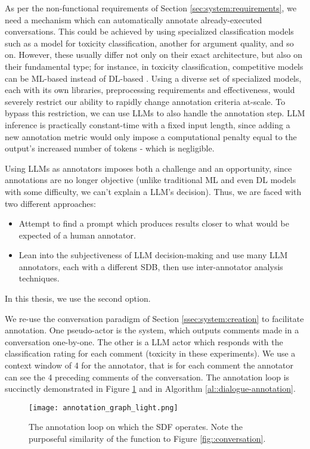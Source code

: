 As per the non-functional requirements of Section \ref{sec:system:requirements}, we need a mechanism which can automatically annotate already-executed conversations. This could be achieved by using specialized classification models such as a model for toxicity classification, another for argument quality, and so on. However, these usually differ not only on their exact architecture, but also on their fundamental type; for instance, in toxicity classification, competitive models can be ML-based instead of DL-based \cite{anjum2024hate}. Using a diverse set of specialized models, each with its own libraries, preprocessing requirements and effectiveness, would severely restrict our ability to rapidly change annotation criteria at-scale. To bypass this restriction, we can use LLMs to also handle the annotation step. LLM inference is practically constant-time with a fixed input length, since adding a new annotation metric would only impose a computational penalty equal to the output's increased number of tokens - which is negligible. 

Using LLMs as annotators imposes both a challenge and an opportunity, since annotations are no longer objective (unlike traditional ML and even DL models with some difficulty, we can't explain a LLM's decision). Thus, we are faced with two different approaches:

\begin{itemize}
	\item Attempt to find a prompt which produces results closer to what would be expected of a human annotator.
	\item Lean into the subjectiveness of LLM decision-making and use many LLM annotators, each with a different SDB, then use inter-annotator analysis techniques.
\end{itemize}

In this thesis, we use the second option.

We re-use the conversation paradigm of Section \ref{ssec:system:creation} to facilitate annotation. One pseudo-actor is the system, which outputs comments made in a conversation one-by-one. The other is a LLM actor which responds with the classification rating for each comment (toxicity in these experiments).  We use a context window of 4 for the annotator, that is for each comment the annotator can see the 4 preceding comments of the conversation. The annotation loop is succinctly demonstrated in Figure \ref{fig::annotation} and in Algorithm \ref{al::dialogue-annotation}.

\begin{figure}
	\centering
	\texttt{[image: annotation\_graph\_light.png]}
	\caption{The annotation loop on which the SDF operates. Note the purposeful similarity of the function to Figure \ref{fig::conversation}.}
	\label{fig::annotation}
\end{figure}

